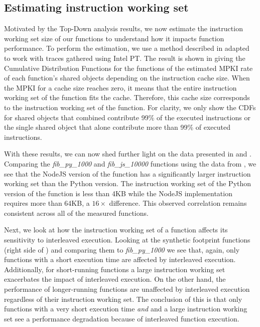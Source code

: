 \subsection{Estimating instruction working set}

\label{wosc:subsec:footprint}

Motivated by the Top-Down analysis results, we now estimate the instruction working set size of our functions to understand how it impacts function performance. To perform the estimation, we use a method described in  \cite{splash2} adapted to work with traces gathered using Intel PT. The result is shown in  giving the Cumulative Distribution Functions for the functions of the estimated MPKI rate of each function's shared objects depending on the instruction cache size. When the MPKI for a cache size reaches zero, it means that the entire instruction working set of the function fits the cache. Therefore, this cache size corresponds to the instruction working set of the function. For clarity, we only show the CDFs for shared objects that combined contribute 99\% of the executed instructions or the single shared object that alone contribute more than 99\% of executed instructions.


With these results, we can now shed further light on the data presented in  and . Comparing the \emph{fib\_py\_1000} and \emph{fib\_js\_10000} functions using the data from  , we see that the NodeJS version of the function has a significantly larger instruction working set than the Python version. The instruction working set of the Python version of the function is less than 4KB while the NodeJS implementation requires more than 64KB, a $16\times$ difference. This observed correlation remains consistent across all of the measured functions.


Next, we look at how the instruction working set of a function affects its sensitivity to interleaved execution. Looking at the synthetic footprint functions (right side of ) and comparing them to \emph{fib\_py\_1000} we see that, again, only functions with a short execution time are affected by interleaved execution. Additionally, for short-running functions a large instruction working set exacerbates the impact of interleaved execution. On the other hand, the performance of longer-running functions are unaffected by interleaved execution regardless of their instruction working set. The conclusion of this is that only functions with a very short execution time \emph{and} and a large instruction working set see a performance degradation because of interleaved function execution.


